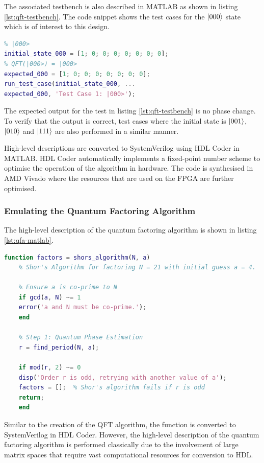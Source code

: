 The associated testbench is also described in MATLAB as shown in listing \ref{lst:qft-testbench}. The code snippet shows the test cases for the $\ket{000}$ state which is of interest to this design. 

\begin{lstlisting}[language=Matlab, caption={Accompying high-level description of the .}, label={lst:qft-testbench}]
% Test case 1: |000> state
% |000>
initial_state_000 = [1; 0; 0; 0; 0; 0; 0; 0];
% QFT(|000>) = |000>  
expected_000 = [1; 0; 0; 0; 0; 0; 0; 0];  
run_test_case(initial_state_000, ...
expected_000, 'Test Case 1: |000>');
\end{lstlisting}
The expected output for the test in listing \ref{lst:qft-testbench} is no phase change. To verify that the output is correct, test cases where the initial state is $\ket{001}$, $\ket{010}$ and $\ket{111}$ are also performed in a similar manner. 
 
High-level descriptions are converted to SystemVerilog using HDL Coder in MATLAB. HDL Coder automatically implements a fixed-point number scheme to optimise the operation of the algorithm in hardware. The code is synthesised in AMD Vivado where the resources that are used on the FPGA are further optimised. 

\subsubsection{Emulating the Quantum Factoring Algorithm}

The high-level description of the quantum factoring algorithm is shown in listing \ref{lst:qfa-matlab}.

\begin{lstlisting}[language=Matlab, caption={Code snippet of the MATLAB high-level description of the quantum factoring algorithm for factoring $N = 4$.}, label={lst:qft-matlab}]
	function factors = shors_algorithm(N, a)
	% Shor's Algorithm for factoring N = 21 with initial guess a = 4.
	
	% Ensure a is co-prime to N
	if gcd(a, N) ~= 1
	error('a and N must be co-prime.');
	end
	
	% Step 1: Quantum Phase Estimation
	r = find_period(N, a);
	
	if mod(r, 2) ~= 0
	disp('Order r is odd, retrying with another value of a');
	factors = [];  % Shor's algorithm fails if r is odd
	return;
	end
\end{lstlisting}
Similar to the creation of the QFT algorithm, the function is converted to SystemVerilog in HDL Coder. However, the high-level description of the quantum factoring algorithm is performed classically due to the involvement of large matrix spaces that require vast computational resources for conversion to HDL.

